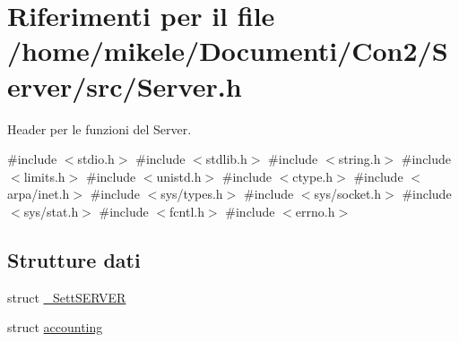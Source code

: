 \hypertarget{a00050}{}\section{Riferimenti per il file /home/mikele/\+Documenti/\+Con2/\+Server/src/\+Server.h}
\label{a00050}


Header per le funzioni del Server.  


{\ttfamily \#include $<$stdio.\+h$>$}\newline
{\ttfamily \#include $<$stdlib.\+h$>$}\newline
{\ttfamily \#include $<$string.\+h$>$}\newline
{\ttfamily \#include $<$limits.\+h$>$}\newline
{\ttfamily \#include $<$unistd.\+h$>$}\newline
{\ttfamily \#include $<$ctype.\+h$>$}\newline
{\ttfamily \#include $<$arpa/inet.\+h$>$}\newline
{\ttfamily \#include $<$sys/types.\+h$>$}\newline
{\ttfamily \#include $<$sys/socket.\+h$>$}\newline
{\ttfamily \#include $<$sys/stat.\+h$>$}\newline
{\ttfamily \#include $<$fcntl.\+h$>$}\newline
{\ttfamily \#include $<$errno.\+h$>$}\newline
\subsection*{Strutture dati}
\begin{DoxyCompactItemize}
\item 
struct \mbox{\hyperlink{a00068}{\+\_\+\+Sett\+S\+E\+R\+V\+ER}}
\item 
struct \mbox{\hyperlink{a00072}{accounting}}
\end{DoxyCompactItemize}
